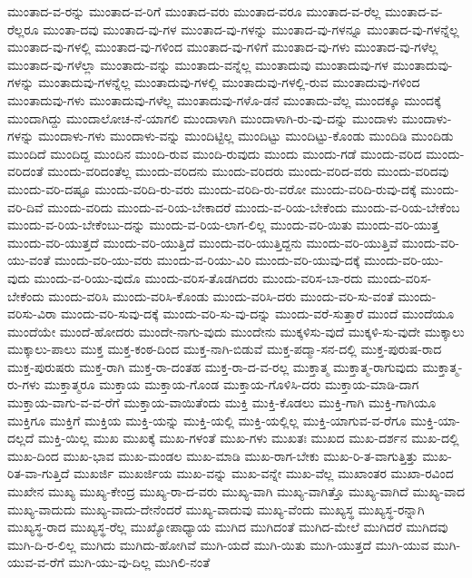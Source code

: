 {ಮುಂತಾದ-ವ-ರನ್ನು
ಮುಂತಾದ-ವ-ರಿಗೆ
ಮುಂತಾದ-ವರು
ಮುಂತಾದ-ವರೂ
ಮುಂತಾದ-ವ-ರೆಲ್ಲ
ಮುಂತಾದ-ವ-ರೆಲ್ಲರೂ
ಮುಂತಾ-ದವು
ಮುಂತಾದ-ವು-ಗಳ
ಮುಂತಾದ-ವು-ಗಳನ್ನು
ಮುಂತಾದ-ವು-ಗಳನ್ನೂ
ಮುಂತಾದ-ವು-ಗಳನ್ನೆಲ್ಲ
ಮುಂತಾದ-ವು-ಗಳಲ್ಲಿ
ಮುಂತಾದ-ವು-ಗಳಿಂದ
ಮುಂತಾದ-ವು-ಗಳಿಗೆ
ಮುಂತಾದ-ವು-ಗಳು
ಮುಂತಾದ-ವು-ಗಳೆಲ್ಲ
ಮುಂತಾದ-ವು-ಗಳೆಲ್ಲಾ
ಮುಂತಾದು-ವನ್ನು
ಮುಂತಾದು-ವನ್ನೆಲ್ಲ
ಮುಂತಾದುವು
ಮುಂತಾದುವು-ಗಳ
ಮುಂತಾದುವು-ಗಳನ್ನು
ಮುಂತಾದುವು-ಗಳನ್ನೆಲ್ಲ
ಮುಂತಾದುವು-ಗಳಲ್ಲಿ
ಮುಂತಾದುವು-ಗಳಲ್ಲಿ-ರುವ
ಮುಂತಾದುವು-ಗಳಿಂದ
ಮುಂತಾದುವು-ಗಳು
ಮುಂತಾದುವು-ಗಳೆಲ್ಲ
ಮುಂತಾದುವು-ಗಳೊ-ಡನೆ
ಮುಂತಾದು-ವೆಲ್ಲ
ಮುಂದಕ್ಕೂ
ಮುಂದಕ್ಕೆ
ಮುಂದಾಗಿದ್ದು
ಮುಂದಾಲೋಚ-ನೆ-ಯಾಗಲಿ
ಮುಂದಾಳಾಗಿ
ಮುಂದಾಳಾಗಿ-ರು-ವು-ದನ್ನು
ಮುಂದಾಳು
ಮುಂದಾಳು-ಗಳನ್ನು
ಮುಂದಾಳು-ಗಳು
ಮುಂದಾಳು-ವನ್ನು
ಮುಂದಿಟ್ಟಿಲ್ಲ
ಮುಂದಿಟ್ಟು
ಮುಂದಿಟ್ಟು-ಕೊಂಡು
ಮುಂದಿಡಿ
ಮುಂದಿಡು
ಮುಂದಿದೆ
ಮುಂದಿದ್ದ
ಮುಂದಿನ
ಮುಂದಿ-ರುವ
ಮುಂದಿ-ರುವುದು
ಮುಂದು
ಮುಂದು-ಗಡೆ
ಮುಂದು-ವರಿದ
ಮುಂದು-ವರಿದಂತೆ
ಮುಂದು-ವರಿದಂತೆಲ್ಲ
ಮುಂದು-ವರಿದನು
ಮುಂದು-ವರಿದರು
ಮುಂದು-ವರಿದ-ವರು
ಮುಂದು-ವರಿದವು
ಮುಂದು-ವರಿ-ದಷ್ಟೂ
ಮುಂದು-ವರಿದಿ-ರು-ವರು
ಮುಂದು-ವರಿದಿ-ರು-ವರೋ
ಮುಂದು-ವರಿದಿ-ರುವು-ದಕ್ಕೆ
ಮುಂದು-ವರಿ-ದಿವೆ
ಮುಂದು-ವರಿದು
ಮುಂದು-ವ-ರಿಯ-ಬೇಕಾದರೆ
ಮುಂದು-ವ-ರಿಯ-ಬೇಕೆಂದು
ಮುಂದು-ವ-ರಿಯ-ಬೇಕೆಂಬ
ಮುಂದು-ವ-ರಿಯ-ಬೇಕೆಂಬು-ದನ್ನು
ಮುಂದು-ವ-ರಿಯ-ಲಾಗ-ಲಿಲ್ಲ
ಮುಂದು-ವರಿ-ಯಿತು
ಮುಂದು-ವರಿ-ಯುತ್ತ
ಮುಂದು-ವರಿ-ಯುತ್ತದೆ
ಮುಂದು-ವರಿ-ಯುತ್ತಿದೆ
ಮುಂದು-ವರಿ-ಯುತ್ತಿದ್ದನು
ಮುಂದು-ವರಿ-ಯುತ್ತಿವೆ
ಮುಂದು-ವರಿ-ಯು-ವಂತೆ
ಮುಂದು-ವರಿ-ಯು-ವರು
ಮುಂದು-ವ-ರಿಯು-ವಿರಿ
ಮುಂದು-ವರಿ-ಯುವು-ದಕ್ಕೆ
ಮುಂದು-ವರಿ-ಯು-ವುದು
ಮುಂದು-ವ-ರಿಯು-ವುದೊ
ಮುಂದು-ವರಿಸ-ತೊಡಗಿದರು
ಮುಂದು-ವರಿಸ-ಬಾ-ರದು
ಮುಂದು-ವರಿಸ-ಬೇಕೆಂದು
ಮುಂದು-ವರಿಸಿ
ಮುಂದು-ವರಿಸಿ-ಕೊಂಡು
ಮುಂದು-ವರಿಸಿ-ದರು
ಮುಂದು-ವರಿ-ಸು-ವಂತೆ
ಮುಂದು-ವರಿಸು-ವಿರಾ
ಮುಂದು-ವರಿ-ಸುವು-ದಕ್ಕೆ
ಮುಂದು-ವರಿ-ಸು-ವು-ದನ್ನು
ಮುಂದು-ವರೆ-ಸುತ್ತಾರೆ
ಮುಂದೆ
ಮುಂದೆಯೂ
ಮುಂದೆಯೇ
ಮುಂದೆ-ಹೋದರು
ಮುಂದೇ-ನಾಗು-ವುದು
ಮುಂದೇನು
ಮುಕ್ಕಳಿಸು-ವುದೆ
ಮುಕ್ಕಳಿ-ಸು-ವುದೇ
ಮುಕ್ಕಾಲು
ಮುಕ್ಕಾಲು-ಪಾಲು
ಮುಕ್ತ
ಮುಕ್ತ-ಕಂಠ-ದಿಂದ
ಮುಕ್ತ-ನಾಗಿ-ಬಿಡುವೆ
ಮುಕ್ತ-ಪದ್ಮಾ-ಸನ-ದಲ್ಲಿ
ಮುಕ್ತ-ಪುರುಷ-ರಾದ
ಮುಕ್ತ-ಪುರುಷರು
ಮುಕ್ತ-ರಾಗಿ
ಮುಕ್ತ-ರಾ-ದಂತಹ
ಮುಕ್ತ-ರಾ-ದ-ವ-ರಲ್ಲ
ಮುಕ್ತಾತ್ಮ
ಮುಕ್ತಾತ್ಮ-ರಾಗುವುದು
ಮುಕ್ತಾತ್ಮ-ರು-ಗಳು
ಮುಕ್ತಾತ್ಮರೂ
ಮುಕ್ತಾಯ
ಮುಕ್ತಾಯ-ಗೊಂಡ
ಮುಕ್ತಾಯ-ಗೊಳಿಸಿ-ದರು
ಮುಕ್ತಾಯ-ಮಾಡಿ-ದಾಗ
ಮುಕ್ತಾಯ-ವಾಗು-ವ-ವ-ರೆಗೆ
ಮುಕ್ತಾಯ-ವಾಯಿತೆಂದು
ಮುಕ್ತಿ
ಮುಕ್ತಿ-ಕೊಡಲು
ಮುಕ್ತಿ-ಗಾಗಿ
ಮುಕ್ತಿ-ಗಾಗಿಯೂ
ಮುಕ್ತಿಗೂ
ಮುಕ್ತಿಗೆ
ಮುಕ್ತಿಯ
ಮುಕ್ತಿ-ಯನ್ನು
ಮುಕ್ತಿ-ಯಲ್ಲಿ
ಮುಕ್ತಿ-ಯಲ್ಲಿಲ್ಲ
ಮುಕ್ತಿ-ಯಾಗುವ-ವ-ರೆಗೂ
ಮುಕ್ತಿ-ಯಾ-ದಲ್ಲದೆ
ಮುಕ್ತಿ-ಯಿಲ್ಲ
ಮುಖ
ಮುಖಕ್ಕೆ
ಮುಖ-ಗಳಂತೆ
ಮುಖ-ಗಳು
ಮುಖತಃ
ಮುಖದ
ಮುಖ-ದರ್ಶನ
ಮುಖ-ದಲ್ಲಿ
ಮುಖ-ದಿಂದ
ಮುಖ-ಭಾವ
ಮುಖ-ಮಂಡಲ
ಮುಖ-ಮಾಡಿ
ಮುಖ-ರಾಗ-ಬೇಕು
ಮುಖ-ರಿ-ತ-ವಾಗುತ್ತಿತ್ತು
ಮುಖ-ರಿತ-ವಾ-ಗುತ್ತಿದೆ
ಮುಖರ್ಜಿ
ಮುಖರ್ಜಿಯ
ಮುಖ-ವನ್ನು
ಮುಖ-ವನ್ನೇ
ಮುಖ-ವೆಲ್ಲ
ಮುಖಾಂತರ
ಮುಖಾ-ರವಿಂದ
ಮುಖೇನ
ಮುಖ್ಯ
ಮುಖ್ಯ-ಕೇಂದ್ರ
ಮುಖ್ಯ-ರಾ-ದ-ವರು
ಮುಖ್ಯ-ವಾಗಿ
ಮುಖ್ಯ-ವಾಗಿತ್ತೊ
ಮುಖ್ಯ-ವಾಗಿದೆ
ಮುಖ್ಯ-ವಾದ
ಮುಖ್ಯ-ವಾದುದು
ಮುಖ್ಯ-ವಾದು-ದೇನೆಂದರೆ
ಮುಖ್ಯ-ವಾದುವು
ಮುಖ್ಯ-ವೆಂದು
ಮುಖ್ಯಸ್ಥ
ಮುಖ್ಯಸ್ಥ-ರನ್ನಾಗಿ
ಮುಖ್ಯಸ್ಥ-ರಾದ
ಮುಖ್ಯಸ್ಥ-ರೆಲ್ಲ
ಮುಖ್ಯೋಪಾಧ್ಯಾಯ
ಮುಗಿದ
ಮುಗಿದಂತೆ
ಮುಗಿದ-ಮೇಲೆ
ಮುಗಿದರೆ
ಮುಗಿದವು
ಮುಗಿ-ದಿ-ರ-ಲಿಲ್ಲ
ಮುಗಿದು
ಮುಗಿದು-ಹೋಗಿವೆ
ಮುಗಿ-ಯದೆ
ಮುಗಿ-ಯಿತು
ಮುಗಿ-ಯುತ್ತದೆ
ಮುಗಿ-ಯುವ
ಮುಗಿ-ಯುವ-ವ-ರೆಗೆ
ಮುಗಿ-ಯು-ವು-ದಿಲ್ಲ
ಮುಗಿಲಿ-ನಂತೆ
}

